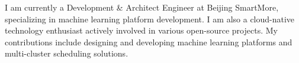 

\begin{cvparagraph}

I am currently a Development \& Architect Engineer at Beijing SmartMore, specializing in machine learning platform development. I am also a cloud-native technology enthusiast actively involved in various open-source projects. My contributions include designing and developing machine learning platforms and multi-cluster scheduling solutions.
\end{cvparagraph}
